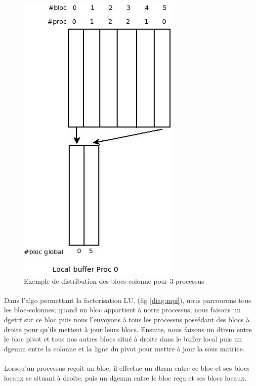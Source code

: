 \documentclass{article}
\begin{document}
\begin{figure}[ht]
  \centering
  \includegraphics[scale=0.5]{pictures/Diagramme_serpentin.jpeg}
  \caption{\label{diag:serpentin} Exemple de distribution des blocs-colonne pour 3 processus}
\end{figure}


\paragraph{}
Dans l'algo permettant la factorisation LU, (fig \ref{diag:mpi}), nous parcourons tous les bloc-colonnes; quand un bloc appartient à notre processus, nous faisons un dgetrf sur ce bloc puis nous l'envoyons à tous les processus possédant des blocs à droite pour qu'ils mettent à jour leurs blocs. 
Ensuite, nous faisons un dtrsm entre le bloc pivot et tous nos autres blocs situé à droite dans le buffer local puis un dgemm entre la colonne et la ligne du pivot pour mettre à jour la sous matrice. 
\paragraph{}Lorsqu'un processus reçoit un bloc, il effectue un dtrsm entre ce bloc et ses blocs locaux se situant à droite, puis un dgemm entre le bloc reçu et ses blocs locaux.
\end{document}
